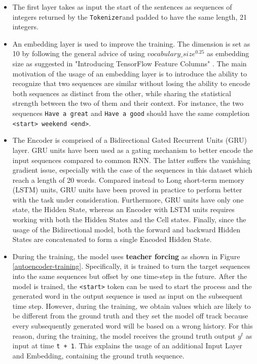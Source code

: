 \documentclass{article}
\begin{document}
\begin{itemize}
\item
  The first layer takes as input the start of the sentences as sequences of integers returned by the \texttt{Tokenizer}and padded to have the same length, 21 integers.
\item
  An embedding layer is used to improve the training. The dimension is set as 10 by following the general advice of using $vocabulary\_size^{0.25}$ as embedding size as suggested in "Introducing TensorFlow Feature Columns" \cite{embedding-size}. The main motivation of the usage of an embedding layer is to introduce the ability to recognize that two sequences are similar without losing the ability to encode both sequences as distinct from the other, while sharing the statistical strength between the two of them and their context. For instance, the two sequences \texttt{Have\ a\ great} and \texttt{Have\ a\ good} should have the same completion \texttt{\textless{}start\textgreater{}\ weekend\ \textless{}end\textgreater{}}.
\item
  The Encoder is comprised of a Bidirectional Gated Recurrent Units (GRU) layer. GRU units have been used as a gating mechanism to better encode the input sequences compared to common RNN. The latter suffers the vanishing gradient issue, especially with the case of the sequences in this dataset which reach a length of 20 words. Compared instead to Long short-term memory (LSTM) units, GRU units have been proved in practice to perform better with the task under consideration. Furthermore, GRU units have only one state, the Hidden State, whereas an Encoder with LSTM units requires working with both the Hidden States and the Cell states. Finally, since the usage of the Bidirectional model, both the forward and backward Hidden States are concatenated to form a single Encoded Hidden State.
\item
  During the training, the model uses \textbf{teacher forcing} as shown in Figure \ref{autoencoder-training}. Specifically, it is trained to turn the target sequences into the same sequences but offset by one time-step in the future. After the model is trained, the \texttt{\textless{}start\textgreater{}} token can be used to start the process and the generated word in the output sequence is used as input on the subsequent time step. However, during the training, we obtain values which are likely to be different from the ground truth and they set the model off track because every subsequently generated word will be based on a wrong history. For this reason, during the training, the model receives the ground truth output $y^t$ as input at time \texttt{t\ +\ 1}. This explains the usage of an additional Input Layer and Embedding, containing the ground truth sequence.


\end{itemize}
\end{document}
